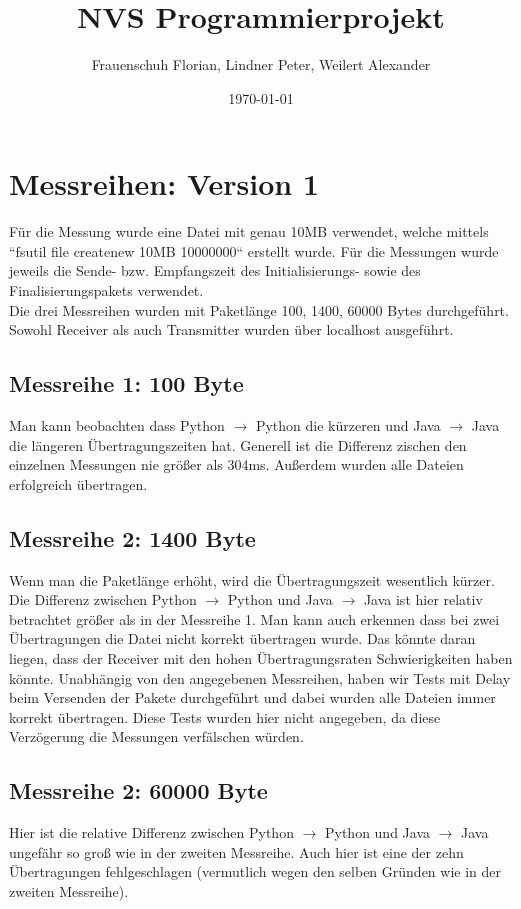 \documentclass{article}
\title{NVS Programmierprojekt}
\author{Frauenschuh Florian, Lindner Peter, Weilert Alexander}
\date{\today}
\begin{document}
\maketitle

\section{Messreihen: Version 1}
Für die Messung wurde eine Datei mit genau 10MB verwendet, welche mittels ``fsutil file createnew 10MB 10000000`` erstellt wurde. Für die Messungen wurde jeweils die Sende- bzw. Empfangszeit des Initialisierungs- sowie des Finalisierungspakets verwendet. \\
Die drei Messreihen wurden mit Paketlänge 100, 1400, 60000 Bytes durchgeführt. \\
Sowohl Receiver als auch Transmitter wurden über localhost ausgeführt.

\subsection{Messreihe 1: 100 Byte}
Man kann beobachten dass Python $\rightarrow$ Python die kürzeren und Java $\rightarrow$ Java die längeren Übertragungszeiten hat. Generell ist die Differenz zischen den einzelnen Messungen nie größer als 304ms. Außerdem wurden alle Dateien erfolgreich übertragen.

\subsection{Messreihe 2: 1400 Byte}
Wenn man die Paketlänge erhöht, wird die Übertragungszeit wesentlich kürzer. Die Differenz zwischen Python $\rightarrow$ Python und Java $\rightarrow$ Java ist hier relativ betrachtet größer als in der Messreihe 1. Man kann auch erkennen dass bei zwei Übertragungen die Datei nicht korrekt übertragen wurde. Das könnte daran liegen, dass der Receiver mit den hohen Übertragungsraten Schwierigkeiten haben könnte. Unabhängig von den angegebenen Messreihen, haben wir Tests mit Delay beim Versenden der Pakete durchgeführt und dabei wurden alle Dateien immer korrekt übertragen. Diese Tests wurden hier nicht angegeben, da diese Verzögerung die Messungen verfälschen würden.

\subsection{Messreihe 2: 60000 Byte}
Hier ist die relative Differenz zwischen Python $\rightarrow$ Python und Java $\rightarrow$ Java ungefähr so groß wie in der zweiten Messreihe. Auch hier ist eine der zehn Übertragungen fehlgeschlagen (vermutlich wegen den selben Gründen wie in der zweiten Messreihe). 
\end{document}

